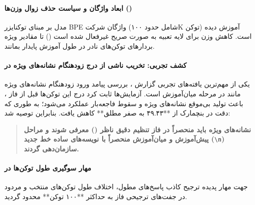 \item {}

\paragraph*{ابعاد واژگان و سیاست حذف زوال وزن‌ها ()}
مدل  \cite{olmo2025olmo3} بر مبنای توکنایزر BPE واژگان  شرکت  (شامل حدود ۱۰۰K توکن) آموزش دیده است. کاهش وزن برای لایه تعبیه به صورت صریح غیرفعال شده است () تا مقادیر ویژه بردارهای توکن‌های نادر در طول آموزش پایدار بمانند.

\paragraph*{کشف تجربی: تخریب ناشی از درج زودهنگام نشانه‌های ویژه در }
یکی از مهم‌ترین یافته‌های تجربی گزارش ، بررسی پیامد ورود زودهنگام نشانه‌های ویژه مانند  در مرحله میان‌آموزش است. آزمایش‌ها ثابت کرد درج این توکن‌ها قبل از فاز ، باعث تولید بی‌موقع نشانه‌های ویژه و سقوط فاجعه‌بار عملکرد می‌شود؛ به طوری که دقت در بنچمارک  از **۴۹.۴۳ به صفر مطلق** کاهش یافت. بنابراین توصیه شد:
\begin{quote}
\textbf{نشانه‌های ویژه باید منحصراً در فاز تنظیم دقیق ناظر () معرفی شوند و مراحل پیش‌آموزش و میان‌آموزش منحصراً با نویسه‌های ساده خط جدید (\texttt{\textbackslash n}) سازمان‌دهی گردند.}
\end{quote}

\paragraph*{مهار سوگیری طول توکن‌ها در }
جهت مهار پدیده ترجیح کاذب پاسخ‌های مطول، اختلاف طول توکن‌های منتخب و مردود در جفت‌های ترجیحی فاز  به حداکثر **۱۰۰ توکن** محدود گردید.
